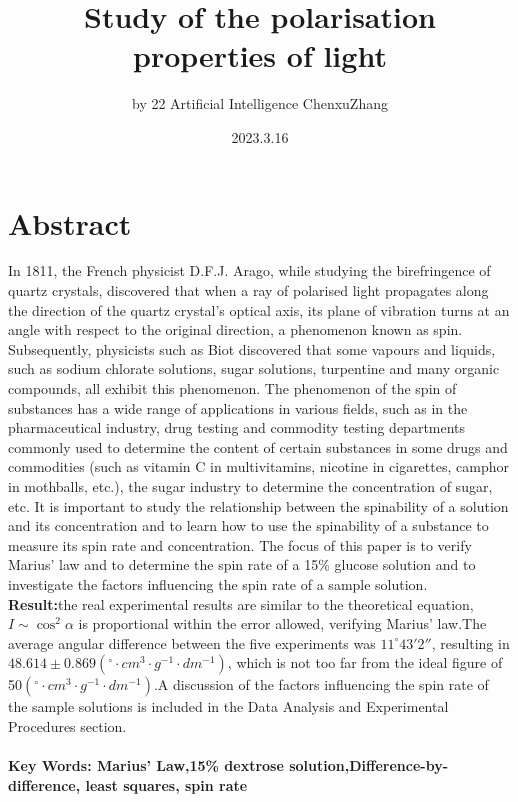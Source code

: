 \documentclass[UTF8]{article}
\title{Study of the polarisation properties of light}
\author{by 22 Artificial Intelligence ChenxuZhang}
\date{2023.3.16}
\begin{document}
	
	\fancyfoot[C]{\thepage}
	
	\maketitle
	\tableofcontents
	\newpage
	
	\section{Abstract}
	In 1811, the French physicist D.F.J. Arago, while studying the birefringence of quartz crystals, discovered that when a ray of polarised light propagates along the direction of the quartz crystal's optical axis, its plane of vibration turns at an angle with respect to the original direction, a phenomenon known as spin. Subsequently, physicists such as Biot discovered that some vapours and liquids, such as sodium chlorate solutions, sugar solutions, turpentine and many organic compounds, all exhibit this phenomenon. The phenomenon of the spin of substances has a wide range of applications in various fields, such as in the pharmaceutical industry, drug testing and commodity testing departments commonly used to determine the content of certain substances in some drugs and commodities (such as vitamin C in multivitamins, nicotine in cigarettes, camphor in mothballs, etc.), the sugar industry to determine the concentration of sugar, etc. It is important to study the relationship between the spinability of a solution and its concentration and to learn how to use the spinability of a substance to measure its spin rate and concentration. The focus of this paper is to verify Marius' law and to determine the spin rate of a 15\% glucose solution and to investigate the factors influencing the spin rate of a sample solution.\\
	\textbf{Result:}the real experimental results are similar to the theoretical equation, $I\sim \cos ^{2} \alpha $ is proportional within the error allowed, verifying Marius' law.The average angular difference between the five experiments was $11 ^{\circ} {43}'{2}''$, resulting in $48.614\pm 0.869\left ( ^{\circ} \cdot cm^{3} \cdot g^{-1} \cdot dm^{-1} \right )$, which is not too far from the ideal figure of 50$\left ( ^{\circ} \cdot cm^{3} \cdot g^{-1} \cdot dm^{-1} \right )$.A discussion of the factors influencing the spin rate of the sample solutions is included in the Data Analysis and Experimental Procedures section.\\
	\\
	\textbf{Key Words: Marius' Law,15\% dextrose solution,Difference-by-difference, least squares, spin rate}
	
\end{document}
